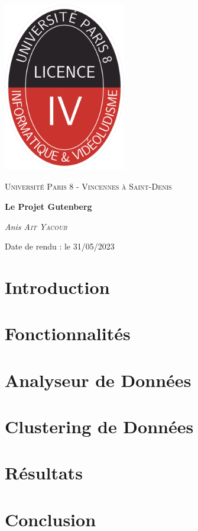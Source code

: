 \documentclass[a4paper,14pt,french]{report}
\begin{document}
\begin{titlepage}
    \centering
    \includegraphics[width=0.4\textwidth]{logo.png}\par\vspace{1cm}
    {\scshape\Large Université Paris 8 - Vincennes à Saint-Denis\par}
    \vspace{1cm}
    {\huge\bfseries Le Projet Gutenberg\par}
    \vspace{1.5cm}
    {\Large\textit{Anis \textsc{Ait Yacoub}}\par}
    \vfill
    Date de rendu : le 31/05/2023\par\vspace{1.75cm}
\end{titlepage}


\tableofcontents

\chapter{Introduction}
\label{ch:introduction}


\chapter{Fonctionnalités}
\label{ch:chapitre1}


\chapter{Analyseur de Données}
\label{ch:chapitre2}


\chapter{Clustering de Données}
\label{ch:chapitre3}


\chapter{Résultats}
\label{ch:chapitre4}


\chapter{Conclusion}
\label{ch:conclusion}

\end{document}
